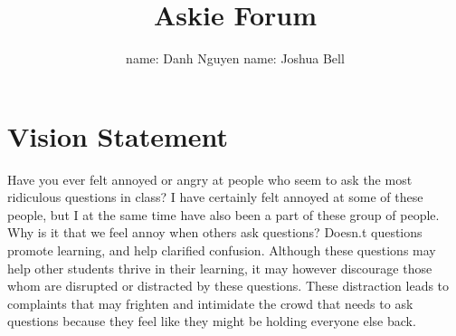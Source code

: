 \documentclass[12pt]{article}
\title{Askie Forum}
\author{
         name: Danh Nguyen
         name: Joshua Bell 
         \linebreak {onid: nguydanh}
         \linebreak {onid: belljos}
    }
\begin{document}
\maketitle

\tableofcontents
\section{Vision Statement}
\doublespacing
Have you ever felt annoyed or angry at people who seem to ask the most ridiculous questions in class? I have certainly felt annoyed at some of these people, but I at the same time have also been a part of these group of people. Why is it that we feel annoy when others ask questions? Doesn.t questions promote learning, and help clarified confusion. Although these questions may help other students thrive in their learning, it may however discourage those whom are disrupted or distracted by these questions. These distraction leads to complaints that may frighten and intimidate the crowd that needs to ask questions because they feel like they might be holding everyone else back.
\end{document}
